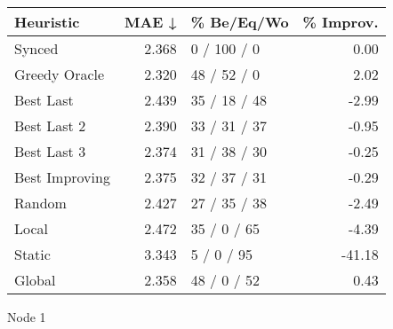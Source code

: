 \begin{tabular}{lrlr}
\toprule
\textbf{Heuristic} & \textbf{MAE ↓} & \textbf{\% Be/Eq/Wo} & \textbf{\% Improv.} \\
\midrule
            Synced &          2.368 &          0 / 100 / 0 &                0.00 \\
     Greedy Oracle &          2.320 &          48 / 52 / 0 &                2.02 \\
         Best Last &          2.439 &         35 / 18 / 48 &               -2.99 \\
       Best Last 2 &          2.390 &         33 / 31 / 37 &               -0.95 \\
       Best Last 3 &          2.374 &         31 / 38 / 30 &               -0.25 \\
    Best Improving &          2.375 &         32 / 37 / 31 &               -0.29 \\
            Random &          2.427 &         27 / 35 / 38 &               -2.49 \\
             Local &          2.472 &          35 / 0 / 65 &               -4.39 \\
            Static &          3.343 &           5 / 0 / 95 &              -41.18 \\
            Global &          2.358 &          48 / 0 / 52 &                0.43 \\
\bottomrule
\end{tabular}
\caption{Node 1}
\label{tab:hr_non_lr05_le2_bs4_1}
